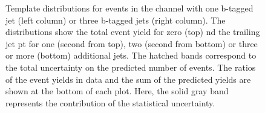 \begin{figure}[htbp!]
\begin{center}
\caption{Template distributions for events in the \ee channel with one b-tagged jet (left column) or three b-tagged jets (right column). The distributions show the total event yield for zero (top) nd the trailing jet pt for one (second from top),
  two (second from bottom) or three or more (bottom) additional jets. 
  The hatched bands correspond to the total uncertainty on the predicted number of events. The ratios of the event yields in data and the sum of the
  predicted yields are shown at the bottom of each plot. Here, the solid
  gray band represents the contribution of the statistical uncertainty.  
       \label{fig:xsec_ee_inputdistr}}
  \end{center}
\end{figure}


